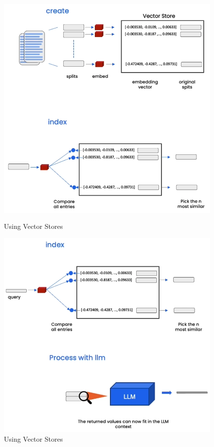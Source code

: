 \documentclass{article}
\begin{document}
\begin{figure}[H]
    \centering
    \begin{minipage}{0.49\textwidth}
        \centering
        \includegraphics[width=\textwidth]{images/langchain_chat_with_your_data_010.png}
        \caption{Using Vector Stores}
        \label{fig:using_vector_stores}
    \end{minipage}
    \hfill
    \begin{minipage}{0.49\textwidth}
        \centering
        \includegraphics[width=\textwidth]{images/langchain_chat_with_your_data_011.png}
        \caption{Using Vector Stores}
        \label{fig:using_vector_stores_2}
    \end{minipage}
\end{figure}
\end{document}
